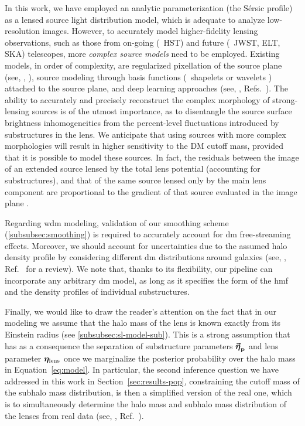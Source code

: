 In this work, we have employed an analytic parameterization (the Sérsic profile) as a lensed source light distribution model, which is adequate to analyze low-resolution images. However, to accurately model higher-fidelity lensing observations, such as those from on-going (\eg~HST) and future (\eg~JWST, ELT, SKA) telescopes, more \emph{complex source models} need to be employed. Existing models, in order of complexity, are regularized pixellation of the source plane (see, \eg, \cite{Suyu:2006fd, Karchev:2021fro, Vegetti:2008eg}), source modeling through basis functions (\eg~shapelets \cite{Birrer:2018xgm} or wavelets \cite{Galan:2020mnn}) attached to the source plane, and deep learning approaches (see, \eg, Refs.~\cite{Adam:2022esz, Morningstar:2019szx}).
The ability to accurately and precisely reconstruct the complex morphology of strong-lensing sources is of the utmost importance, as to disentangle the source surface brightness inhomogeneities from the percent-level fluctuations introduced by substructures in the lens. We anticipate that using sources with more complex morphologies will result in higher sensitivity to the DM cutoff mass, provided that it is possible to model these sources. In fact, the residuals between the image of an extended source lensed by the total lens potential (accounting for substructures), and that of the same source lensed only by the main lens component are proportional to the gradient of that source evaluated in the image plane \cite[Equation 16]{Cyr-Racine:2019aa}. 

Regarding \gls*{wdm} modeling, validation of our smoothing scheme (\autoref{subsubsec:smoothing}) is required to accurately account for \gls*{dm} free-streaming effects. Moreover, we should account for uncertainties due to the assumed halo density profile by considering different \gls*{dm} distributions around galaxies (see, \eg, Ref.~\cite{Salucci:2018aa} for a review). We note that, thanks to its flexibility, our pipeline can incorporate any arbitrary \gls*{dm} model, as long as it specifies the form of the \gls*{hmf} and the density profiles of individual substructures. 
 
Finally, we would like to draw the reader's attention on the fact that in our modeling we assume that the halo mass of the lens is known exactly from its Einstein radius (see \autoref{subsubsec:sl-model-sub}). 
This is a strong assumption that has as a consequence the separation of substructure parameters $\boldsymbol{\vec{{\bm{\eta}}}_\mathrm{p}}$ and lens parameter $\bm{\eta}_\mathrm{lens}$ once we marginalize the posterior probability over the halo mass in Equation~\eqref{eq:model}.
In particular, the second inference question we have addressed in this work in Section~\ref{sec:results-pop}, constraining the cutoff mass of the subhalo mass distribution, is then a simplified version of the real one, which is to simultaneously determine the halo mass and subhalo mass distribution of the lenses from real data (see, \eg, Ref.~\cite{Birrer:2017rpp}). 

